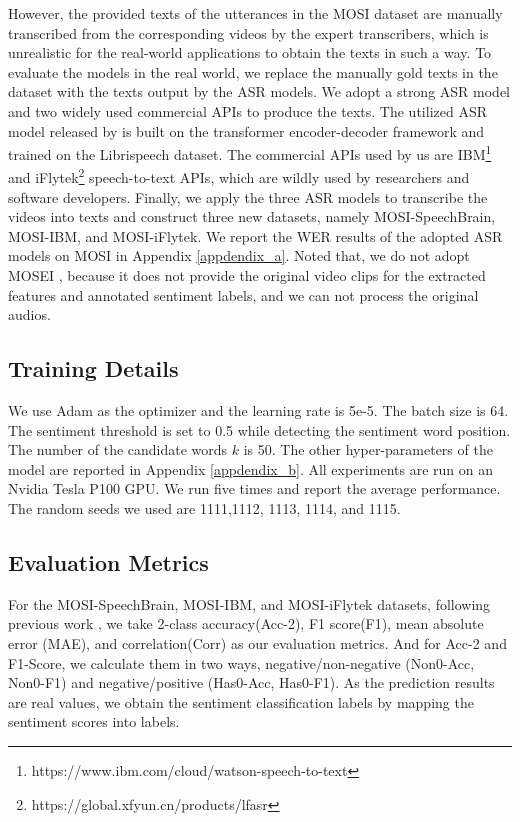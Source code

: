\documentclass[11pt]{article}
\begin{document}
However, the provided texts of the utterances in the MOSI dataset are manually transcribed from the corresponding videos by the expert transcribers, which is unrealistic for the real-world applications to obtain the texts in such a way. To evaluate the models in the real world, we replace the manually gold texts in the dataset with the texts output by the ASR models. We adopt a strong ASR model and two widely used commercial APIs to produce the texts. The utilized ASR model released by \citet{speechbrain} is built on the transformer encoder-decoder framework and trained on the Librispeech dataset\cite{panayotov2015librispeech}. The commercial APIs used by us are IBM\footnote{https://www.ibm.com/cloud/watson-speech-to-text} and iFlytek\footnote{https://global.xfyun.cn/products/lfasr} speech-to-text APIs, which are wildly used by researchers and software developers. Finally, we apply the three ASR models to transcribe the videos into texts and construct three new datasets, namely MOSI-SpeechBrain, MOSI-IBM, and MOSI-iFlytek. We report the WER results of the adopted ASR models on MOSI in Appendix \ref{appdendix_a}. Noted that, we do not adopt MOSEI \cite{bagher-zadeh-etal-2018-multimodal}, because it does not provide the original video clips for the extracted features and annotated sentiment labels, and we can not process the original audios. 

\subsection{Training Details}
We use Adam as the optimizer and the learning rate is 5e-5. The batch size is 64. The sentiment threshold is set to 0.5 while detecting the sentiment word position. The number of the candidate words $k$ is 50. The other hyper-parameters of the model are reported in Appendix \ref{appdendix_b}. All experiments are run on an Nvidia Tesla P100 GPU. We run five times and report the average performance. The random seeds we used are 1111,1112, 1113, 1114, and 1115.

\subsection{Evaluation Metrics}
For the MOSI-SpeechBrain, MOSI-IBM, and MOSI-iFlytek datasets, following previous work \cite{Yu_Xu_Yuan_Wu_2021}, we take 2-class accuracy(Acc-2), F1 score(F1), mean absolute error (MAE), and correlation(Corr) as our evaluation metrics. And for Acc-2 and F1-Score, we calculate them in two ways, negative/non-negative (Non0-Acc, Non0-F1) and negative/positive (Has0-Acc, Has0-F1). As the prediction results are real values, we obtain the sentiment classification labels by mapping the sentiment scores into labels.
\end{document}
